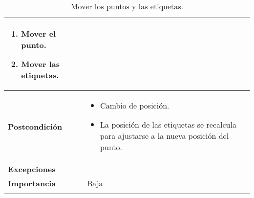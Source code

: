 \begin{longtable}[H]{@{}l|l@{}}
\begin{minipage}[t]{0.71\columnwidth}
\begin{enumerate}
			\def\labelenumi{\arabic{enumi}.}
			\tightlist
			\item Mover el punto.
			\item Mover las etiquetas. 
		\end{enumerate}
	\end{minipage}\tabularnewline
	\midrule
	\begin{minipage}[t]{0.23\columnwidth}\raggedright\strut
		\textbf{Postcondición}\strut
	\end{minipage} & \begin{minipage}[t]{0.71\columnwidth}\raggedright\strut
		\begin{itemize}
			\item Cambio de posición.
			\item La posición de las etiquetas se recalcula para ajustarse a la nueva posición del punto.
		\end{itemize}
	\end{minipage}\tabularnewline
	\midrule
	\begin{minipage}[t]{0.23\columnwidth}\raggedright\strut
		\textbf{Excepciones}\strut
	\end{minipage} & \begin{minipage}[t]{0.71\columnwidth}\raggedright
		
	\end{minipage}\tabularnewline
	\midrule
	\begin{minipage}[t]{0.23\columnwidth}\raggedright\strut
		\textbf{Importancia}\strut
	\end{minipage} & \begin{minipage}[t]{0.71\columnwidth}\raggedright\strut
		Baja\strut
	\end{minipage}\tabularnewline
	\bottomrule
	\caption{Mover los puntos y las etiquetas.}
	\label{cu:3.2}
\end{longtable}
\newpage


